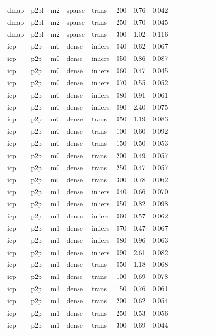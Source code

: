\begin{table}[htbp]
\begin{tabular}{llllllrrrrrrrr}
  dmap & p2pl & m2 & sparse & trans & 200 & 0.76 & 0.042 \\
  dmap & p2pl & m2 & sparse & trans & 250 & 0.70 & 0.045 \\
  dmap & p2pl & m2 & sparse & trans & 300 & 1.02 & 0.116 \\
  icp & p2p & m0 & dense & inliers & 040 & 0.62 & 0.067 \\
  icp & p2p & m0 & dense & inliers & 050 & 0.86 & 0.087 \\
  icp & p2p & m0 & dense & inliers & 060 & 0.47 & 0.045 \\
  icp & p2p & m0 & dense & inliers & 070 & 0.55 & 0.052 \\
  icp & p2p & m0 & dense & inliers & 080 & 0.91 & 0.061 \\
  icp & p2p & m0 & dense & inliers & 090 & 2.40 & 0.075 \\
  icp & p2p & m0 & dense & trans & 050 & 1.19 & 0.083 \\
  icp & p2p & m0 & dense & trans & 100 & 0.60 & 0.092 \\
  icp & p2p & m0 & dense & trans & 150 & 0.50 & 0.053 \\
  icp & p2p & m0 & dense & trans & 200 & 0.49 & 0.057 \\
  icp & p2p & m0 & dense & trans & 250 & 0.47 & 0.057 \\
  icp & p2p & m0 & dense & trans & 300 & 0.78 & 0.062 \\
  icp & p2p & m1 & dense & inliers & 040 & 0.66 & 0.070 \\
  icp & p2p & m1 & dense & inliers & 050 & 0.82 & 0.098 \\
  icp & p2p & m1 & dense & inliers & 060 & 0.57 & 0.062 \\
  icp & p2p & m1 & dense & inliers & 070 & 0.47 & 0.067 \\
  icp & p2p & m1 & dense & inliers & 080 & 0.96 & 0.063 \\
  icp & p2p & m1 & dense & inliers & 090 & 2.61 & 0.082 \\
  icp & p2p & m1 & dense & trans & 050 & 1.18 & 0.068 \\
  icp & p2p & m1 & dense & trans & 100 & 0.69 & 0.078 \\
  icp & p2p & m1 & dense & trans & 150 & 0.76 & 0.061 \\
  icp & p2p & m1 & dense & trans & 200 & 0.62 & 0.054 \\
  icp & p2p & m1 & dense & trans & 250 & 0.53 & 0.056 \\
  icp & p2p & m1 & dense & trans & 300 & 0.69 & 0.044 \\

\end{tabular}
\end{table}
